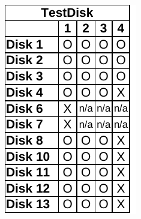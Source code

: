 \begin{paraphrase}
\begin{figure}
\begin{subfigure}[t]{0.17\linewidth}
        \includegraphics[width=\linewidth]{fig/testdisk_results_ntfs.pdf}
    \end{subfigure}~~
    \begin{subfigure}[t]{0.17\linewidth}

\end{subfigure}
\end{figure}
\end{paraphrase}
